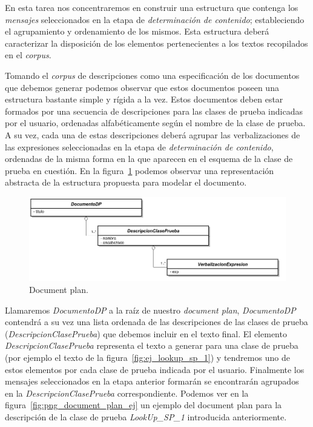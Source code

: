 En esta tarea nos concentraremos en construir una estructura que contenga los \emph{mensajes} seleccionados en la etapa de \emph{determinación de contenido}; estableciendo el agrupamiento y ordenamiento de los mismos. Esta estructura deberá caracterizar la disposición de los elementos pertenecientes a los textos recopilados en el \emph{corpus}. 

Tomando el \emph{corpus} de descripciones como una especificación de los documentos que debemos generar podemos observar que estos documentos poseen una estructura bastante simple y rígida a la vez. Estos documentos deben estar formados por una secuencia de descripciones para las clases de prueba indicadas por el usuario, ordenadas alfabéticamente según el nombre de la clase de prueba. A su vez, cada una de estas descripciones deberá agrupar las verbalizaciones de las expresiones seleccionadas en la etapa de \emph{determinación de contenido}, ordenadas de la misma forma en la que aparecen en el esquema de la clase de prueba en cuestión. En la figura~\ref{fig:png_document_plan} podemos observar una representación abstracta de la estructura propuesta para modelar el documento.

\begin{figure}[H]
  	\centering
	\includegraphics[scale=0.4]{img/document_plan.png}
	\caption{Document plan.}
  	\label{fig:png_document_plan}
\end{figure}

Llamaremos \emph{DocumentoDP} a la raíz de nuestro \emph{document plan}, \emph{DocumentoDP} contendrá a su vez una lista ordenada de las descripciones de las clases de prueba (\emph{DescripcionClasePrueba}) que debemos incluir en el texto final. El elemento \emph{DescripcionClasePrueba} representa el texto a generar para una clase de prueba (por ejemplo el texto de la figura~\ref{fig:ej_lookup_sp_1}) y tendremos uno de estos elementos por cada clase de prueba indicada por el usuario. Finalmente los mensajes seleccionados en la etapa anterior formarán se encontrarán agrupados en la \emph{DescripcionClasePrueba} correspondiente. Podemos ver en la figura~\ref{fig:png_document_plan_ej} un ejemplo del document plan para la descripción de la clase de prueba \emph{LookUp\_SP\_1} introducida anteriormente. 

